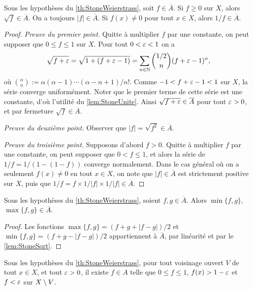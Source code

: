 \begin{lemma}
\label{lem:StoneSqrt}
%
	Sous les hypothèses du \cref{th:StoneWeierstrass}, soit $f \in \overline A$. Si $f\geq 0$ sur $X$, alors $\sqrt f \in \overline A$. On a toujours $|f|\in \overline A$. Si $f(x) \neq 0$ pour tout $x\in X$, alors $1/f \in \overline A$.
\end{lemma}

\begin{proof}
	\emph{Preuve du premier point.}
	Quitte à multiplier $f$ par une constante, on peut supposer que $0\leq f \leq 1$ sur $X$. 
	Pour tout $0 < \varepsilon < 1$ on a 
	\begin{equation}
		\sqrt{f+\varepsilon} = \sqrt{1+(f+\varepsilon-1)} = \sum_{n \in \mathbb{N}} \binom{1/2} n (f+\varepsilon-1)^n,
	\end{equation}
	où $\binom \alpha n := \alpha (\alpha-1) \cdots (\alpha-n+1) / n !$. 
	Comme $-1 < f+\varepsilon -1 < 1$ sur $X$, la série converge uniformément. Noter que le premier terme de cette série est une constante, d'où l'utilité du \cref{lem:StoneUnite}. Ainsi $\sqrt{f+\varepsilon} \in \overline A$ pour tout $\varepsilon>0$, et par fermeture $\sqrt f \in \overline A$.  
	
	\emph{Preuve du deuxième point.} Observer que $|f| = \sqrt{f^2} \in \overline A$.  
	
	\emph{Preuve du troisième point.}
	Supposons d'abord $f>0$. Quitte à multiplier $f$ par une constante, on peut supposer que $0<f\leq 1$, et alors la série de $1/f = 1/(1-(1-f))$ converge normalement. 
	Dans le cas général où on a seulement $f(x) \neq 0$ en tout $x\in X$, on note que $|f| \in \overline A$ est strictement positive sur $X$, puis que $1/f = f\times 1/|f| \times 1/|f| \in \overline A$.
\end{proof}

\begin{corollary}
\label{corol:StoneMinMax}
%
	Sous les hypothèses du \cref{th:StoneWeierstrass}, soient $f,g \in \overline A$. Alors $\min\{f,g\}$, $\max\{f,g\} \in \overline A$.
\end{corollary}

\begin{proof}
	Les fonctions $\max \{f,g\} = (f+g+|f-g|)/2$ et $\min \{f,g\} = (f+g-|f-g|)/2$ appartiennent à $\overline A$, par linéarité et par le \cref{lem:StoneSqrt}. 
\end{proof}

\begin{lemma}
\label{lem:StoneDirac}
%
	Sous les hypothèses du \cref{th:StoneWeierstrass}, 
	pour tout voisinage ouvert $V$ de tout $x \in X$, et tout $\varepsilon>0$, il existe $f \in A$ telle que $0 \leq f \leq 1$, $f(x)>1-\varepsilon$ et $f< \varepsilon$ sur $X \setminus V$. 	
\end{lemma}

